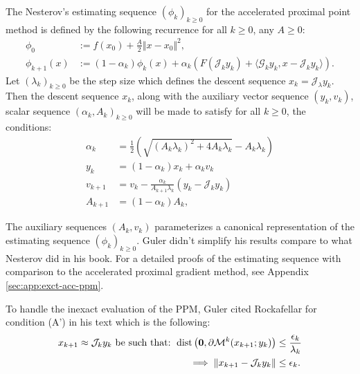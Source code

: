 \documentclass[12pt]{article}
\begin{document}
    \begin{definition}\label{def:nes-est-seq-acc-ppm}
        The Nesterov's estimating sequence $(\phi_k)_{k \ge0}$ for the accelerated proximal point method is defined by the following recurrence for all $k \ge0$, any $A \ge 0$: 
        \begin{align*}
            \phi_0 &:= f(x_0) + \frac{A}{2}\Vert x - x_0\Vert^2, 
            \\
            \phi_{k + 1}(x) &:= 
            (1 - \alpha_k)\phi_k(x)
            + 
            \alpha_k(F(\mathcal J_k y_k) + \langle \mathcal G_k y_k, x - \mathcal J_k y_k\rangle).    
        \end{align*}
        Let $(\lambda_k)_{k \ge 0}$ be the step size which defines the descent sequence $x_k = \mathcal J_\lambda y_k$. 
        Then the descent sequence $x_k$, along with the auxiliary vector sequence $(y_k, v_k)$, scalar sequence $(\alpha_k, A_k)_{k\ge 0}$ will be made to satisfy for all $k\ge0$, the conditions: 
        \begin{align*}
            \alpha_k &= \frac{1}{2}\left(
                \sqrt{(A_k\lambda_k)^2 + 4A_k \lambda_k}
                - A_k\lambda_k
            \right) 
            \\
            y_k &= (1 - \alpha_k)x_k + \alpha_k v_k
            \\
            v_{k + 1}
            &= 
            v_k - \frac{\alpha_k}{A_{k + 1}\lambda_k}(y_k - \mathcal J_k y_k)
            \\
            A_{k + 1} &= (1 - \alpha_k)A_k, 
        \end{align*}
    \end{definition}
    \begin{remark}
        The auxiliary sequences $(A_k, v_k)$ parameterizes a canonical representation of the estimating sequence $(\phi_k)_{k \ge0}$. 
        Guler didn't simplify his results compare to what Nesterov did in his book. 
        For a detailed proofs of the estimating sequence with comparison to the accelerated proximal gradient method, see Appendix \ref*{sec:app:exct-acc-ppm}. 
    \end{remark}
    To handle the inexact evaluation of the PPM, Guler cited Rockafellar \cite{rockafellar_monotone_1976} for condition (A') in his text which is the following: 
    \begin{align*}
        x_{k + 1}\approx \mathcal J_{k} y_k \text{ be such that: }
        \operatorname{dist}\left(
            \mathbf 0, \partial \mathcal M^{k}(x_{k + 1}; y_k)
        \right) &\le \frac{\epsilon_k}{\lambda_k}
        \\
        \implies 
        \Vert x_{k + 1} - \mathcal J_{k}y_k\Vert 
        &\le \epsilon_k. 
    \end{align*}
\end{document}
